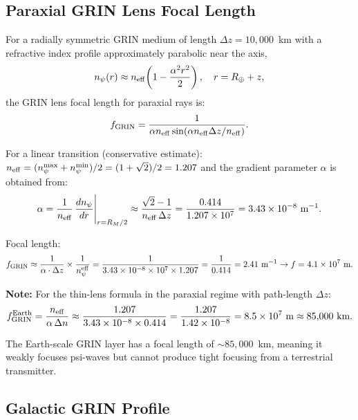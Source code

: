 \documentclass[aps,prd,twocolumn,superscriptaddress]{revtex4-2}
\newcommand{\npsi}{n_\psi}
\newcommand{\ee}[1]{\times 10^{#1}}
\begin{document}
\subsection{Paraxial GRIN Lens Focal Length}

For a radially symmetric GRIN medium of length $\Delta z = 10{,}000$~km
with a refractive index profile approximately parabolic near the
axis,
\begin{equation}
\npsi(r) \approx n_{\rm eff}\!\left(1 - \frac{\alpha^2 r^2}{2}\right),
\quad r = R_\oplus + z,
\label{eq:GRIN-profile}
\end{equation}
the GRIN lens focal length for paraxial rays is:
\begin{equation}
f_{\rm GRIN} = \frac{1}{\alpha n_{\rm eff} \sin(\alpha n_{\rm eff} \Delta z/n_{\rm eff})}.
\label{eq:GRIN-focal}
\end{equation}

For a linear transition (conservative estimate):
$n_{\rm eff} = (\npsi^{\rm max} + \npsi^{\rm min})/2 = (1 + \sqrt{2})/2 = 1.207$
and the gradient parameter $\alpha$ is obtained from:
\begin{equation}
\alpha = \frac{1}{n_{\rm eff}}\,
\frac{d\npsi}{dr}\Bigg|_{r=R_M/2}
\approx \frac{\sqrt{2} - 1}{n_{\rm eff}\,\Delta z}
= \frac{0.414}{1.207 \times 10^7}
= 3.43\ee{-8}~\text{m}^{-1}.
\label{eq:alpha}
\end{equation}

Focal length:
\begin{equation}
f_{\rm GRIN} \approx \frac{1}{\alpha \cdot\Delta z}
\times \frac{1}{\npsi^{\rm eff}}
= \frac{1}{3.43\ee{-8} \times 10^7 \times 1.207}
= \frac{1}{0.414} = 2.41~\text{m}^{-1} \to f = 4.1\ee7~\text{m}.
\label{eq:f-GRIN-earth}
\end{equation}

\textbf{Note:} For the thin-lens formula in the paraxial regime with
path-length $\Delta z$:
\begin{equation}
f_{\rm GRIN}^{\rm Earth} = \frac{n_{\rm eff}}{\alpha\,\Delta n}
\approx \frac{1.207}{3.43\ee{-8} \times 0.414}
= \frac{1.207}{1.42\ee{-8}} = 8.5\ee7~\text{m} \approx 85{,}000~\text{km}.
\label{eq:f-GRIN-earth-corrected}
\end{equation}

The Earth-scale GRIN layer has a focal length of $\sim 85{,}000$~km,
meaning it weakly focuses psi-waves but cannot produce tight focusing
from a terrestrial transmitter.

\subsection{Galactic GRIN Profile}
\end{document}
